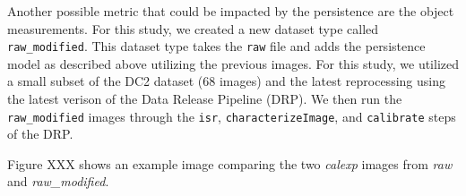 \documentclass[DM,authoryear,toc]{lsstdoc}
\begin{document}
Another possible metric that could be impacted by the persistence are the object measurements.
For this study, we created a new dataset type called \texttt{raw_modified}. 
This dataset type takes the \texttt{raw} file and adds the persistence model as described above utilizing the previous images.
For this study, we utilized a small subset of the DC2 dataset (68 images) and the latest reprocessing using the latest verison of the Data Release Pipeline (DRP).
We then run the \texttt{raw_modified} images through the \texttt{isr}, \texttt{characterizeImage}, and \texttt{calibrate} steps of the DRP\@. 

Figure XXX shows an example image comparing the two \textit{calexp} images from \textit{raw} and \textit{raw_modified}.






\end{document}
